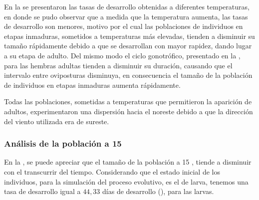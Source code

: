 En la  se presentaron las tasas de desarrollo obtenidas a
diferentes temperaturas, en donde se pudo observar que a medida que la temperatura aumenta, las
tasas de desarrollo son menores, motivo por el cual las poblaciones de individuos en etapas
inmaduras, sometidos a temperaturas más elevadas, tienden a disminuir su tamaño rápidamente debido
a que se desarrollan con mayor rapidez, dando lugar a su etapa de adulto. Del mismo modo el ciclo
gonotrófico, presentado en la , para las hembras adultas
tienden a disminuir su duración, causando que el intervalo entre oviposturas disminuya, en
consecuencia el tamaño de la población de individuos en etapas inmaduras aumenta rápidamente.

Todas las poblaciones, sometidas a temperaturas que permitieron la aparición de adultos,
experimentaron una dispersión hacia el noreste debido a que la dirección del viento utilizada era
de sureste.


\subsubsection{Análisis de la población a 15 \textcelsius}
En la , se puede apreciar que el tamaño de la población a 15
\textcelsius, tiende a disminuir con el transcurrir del tiempo. Considerando que el estado inicial
de los individuos, para la simulación del proceso evolutivo, es el de larva, tenemos una tasa de
desarrollo igual a $44,33$ días de desarrollo
(), para las larvas.

